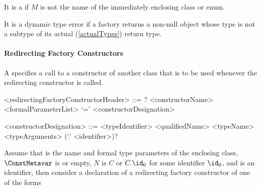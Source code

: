 \documentclass[makeidx]{article}
\begin{document}

\LMHash{}%
It is a  if $M$ is not the name of
the immediately enclosing class or enum.

\LMHash{}%
It is a dynamic type error if a factory returns a non-null object
whose type is not a subtype of its actual
(\ref{actualTypes})
return type.




\paragraph{Redirecting Factory Constructors}

\LMHash{}%
A 
specifies a call to a constructor of another class that is to be used
whenever the redirecting constructor is called.

\begin{grammar}
<redirectingFactoryConstructorHeader> ::= \gnewline{}
  \CONST? \FACTORY{} <constructorName> <formalParameterList> `=' \gnewline{}
  <constructorDesignation>

<constructorDesignation> ::= <typeIdentifier>
  \alt <qualifiedName>
  \alt <typeName> <typeArguments> (`.' <identifier>)?
\end{grammar}

Assume that
%
is the name and formal type parameters of the enclosing class,
%
$\ConstMetavar$ is \CONST{} or empty,
$N$ is $C$ or $C.\id_0$ for some identifier $\id_0$,
and \DefineSymbol{\id} is an identifier,
then consider a declaration of a redirecting factory constructor
 of one of the forms
\end{document}
